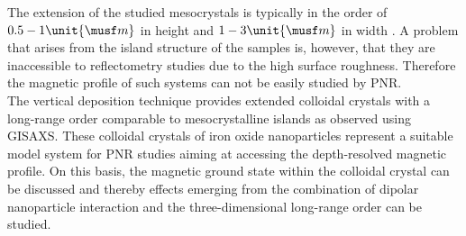 \documentclass[\main/dresen_thesis.tex]{subfiles}
\begin{document}
  The extension of the studied mesocrystals is typically in the order of $0.5 - 1 \unit{\musf m}$ in height and $1 - 3 \unit{\musf m}$ in width \cite{Wetterskog_2016_Tunin}.
  A problem that arises from the island structure of the samples is, however, that they are inaccessible to reflectometry studies due to the high surface roughness.
  Therefore the magnetic profile of such systems can not be easily studied by PNR.
  \\

  The vertical deposition technique provides extended colloidal crystals with a long-range order comparable to mesocrystalline islands as observed using GISAXS.
  These colloidal crystals of iron oxide nanoparticles represent a suitable model system for PNR studies aiming at accessing the depth-resolved magnetic profile.
  On this basis, the magnetic ground state within the colloidal crystal can be discussed and thereby effects emerging from the combination of dipolar nanoparticle interaction and the three-dimensional long-range order can be studied.
\end{document}
